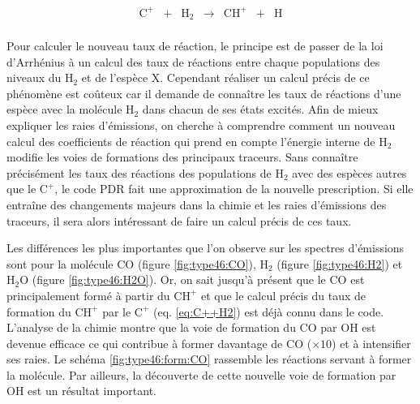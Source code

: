 \begin{equation} \label{eq:C++H2}
    \begin{array}{lllclll}
        \mathrm{C}^+ & + &\mathrm{H}_2   & \rightarrow &\mathrm{CH}^+  & + & \mathrm{H} \\
    \end{array}
\end{equation}

Pour calculer le nouveau taux de réaction, le principe est de passer de la loi d'Arrhénius à un calcul des taux de réactions entre chaque populations des niveaux du $\mathrm{H}_2$ et de l'espèce $\mathrm{X}$. Cependant réaliser un calcul précis de ce phénomène est coûteux car il demande de connaître les taux de réactions d'une espèce avec la molécule $\mathrm{H}_2$ dans chacun de ses états excités. Afin de mieux expliquer les raies d'émissions, on cherche à comprendre comment un nouveau calcul des coefficients de réaction qui prend en compte l'énergie interne de $\mathrm{H}_2$ modifie les voies de formations des principaux traceurs. Sans connaître précisément les taux des réactions des populations de $\mathrm{H}_2$ avec 
des espèces autres que le $\mathrm{C}^+$, le code PDR fait une approximation de la nouvelle prescription. Si elle entraîne des changements majeurs dans la chimie et les raies d'émissions des traceurs, il sera alors intéressant de faire un calcul précis de ces taux. \newline 

Les différences les plus importantes que l'on observe sur les spectres d'émissions sont pour la molécule $\mathrm{CO}$ (figure \ref{fig:type46:CO}), $\mathrm{H}_2$ (figure \ref{fig:type46:H2}) et $\mathrm{H}_2\mathrm{O}$ (figure \ref{fig:type46:H2O}). Or, on sait jusqu'à présent que le $\mathrm{CO}$ est principalement formé à partir du $\mathrm{CH}^+$ et que le calcul précis du taux de formation du $\mathrm{CH}^+$ par le $\mathrm{C}^+$ (eq. \ref{eq:C++H2}) est déjà connu dans le code. L'analyse de la chimie montre que la voie de formation du $\mathrm{CO}$ par $\mathrm{OH}$ est devenue efficace ce qui contribue à former davantage de $\mathrm{CO}$ ($\times 10$) et à intensifier ses raies. Le schéma \ref{fig:type46:form:CO} rassemble les réactions servant à former la molécule. Par ailleurs, la découverte de cette nouvelle voie de formation par $\mathrm{OH}$ est un résultat important. 

